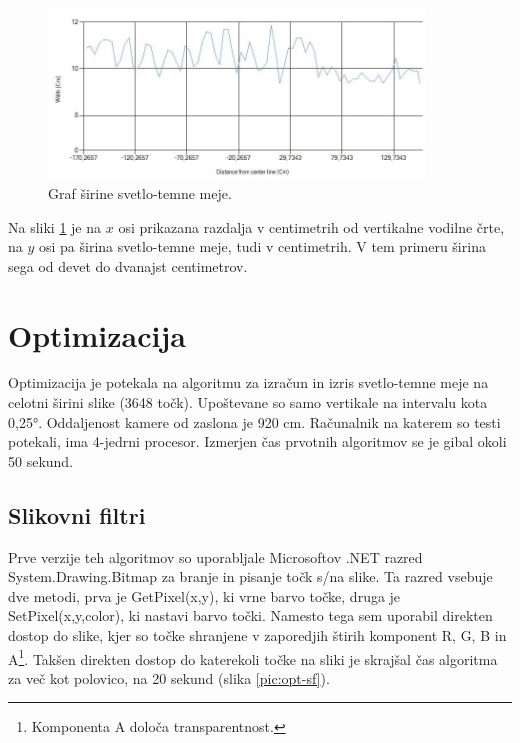 \documentclass[oneside, a4paper, 12pt]{book}
\begin{document}
\begin{figure}
\begin{center}
\includegraphics[width=10cm]{slike/graf-sirina-s-t-meja-crop.jpg}
\end{center}
\caption{Graf širine svetlo-temne meje.}
\label{pic:st-sirina}
\end{figure}


Na sliki \ref{pic:st-sirina} je na $x$ osi prikazana razdalja v centimetrih od vertikalne vodilne črte, na $y$ osi pa širina svetlo-temne meje, tudi v centimetrih. V tem primeru širina sega od devet do dvanajst centimetrov.


\section{Optimizacija}
Optimizacija je potekala na algoritmu za izračun in izris svetlo-temne meje na celotni širini slike (3648 točk). Upoštevane so samo vertikale na intervalu kota 0,25°. Oddaljenost kamere od zaslona je 920 cm. Računalnik na katerem so testi potekali, ima 4-jedrni procesor. Izmerjen čas prvotnih algoritmov se je gibal okoli 50 sekund.

\subsection{Slikovni filtri}
Prve verzije teh algoritmov so uporabljale Microsoftov .NET razred System.\-Drawing.\-Bitmap za branje in pisanje točk s/na slike. Ta razred vsebuje dve metodi, prva je GetPixel(x,y), ki vrne barvo točke, druga je SetPixel(x,y,color), ki nastavi barvo točki. Namesto tega sem uporabil direkten dostop do slike, kjer so točke shranjene v zaporedjih štirih komponent R, G, B in A\footnote{Komponenta A določa transparentnost.}. Takšen direkten dostop do katerekoli točke na sliki je skrajšal čas algoritma za več kot polovico, na 20 sekund (slika \ref{pic:opt-sf}).
\end{document}
